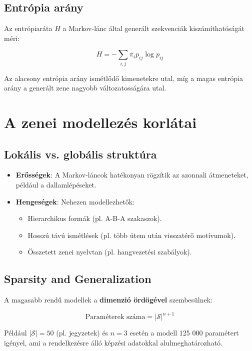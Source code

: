 \subsection{Entrópia arány}

Az entrópiaráta \( H \) a Markov-lánc által generált szekvenciák kiszámíthatóságát méri:

\[
H = -\sum_{i,j} \pi_i p_{ij} \log p_{ij}
\]

Az alacsony entrópia arány ismétlődő kimenetekre utal, míg a magas entrópia arány a generált zene nagyobb változatosságára utal.

\section{A zenei modellezés korlátai}

\subsection{Lokális vs. globális struktúra}

\begin{itemize}
    \item \textbf{Erősségek}: A Markov-láncok hatékonyan rögzítik az azonnali átmeneteket, például a dallamlépéseket.
    \item \textbf{Hengeségek}: Nehezen modellezhetők:
    \begin{itemize}
        \item Hierarchikus formák (pl. A-B-A szakaszok).
        \item Hosszú távú ismétlések (pl. több ütem után visszatérő motívumok).
        \item Összetett zenei nyelvtan (pl. hangvezetési szabályok).
    \end{itemize}
\end{itemize}

\subsection{Sparsity and Generalization}

A magasabb rendű modellek a \textbf{dimenzió ördögével} szembesülnek:

\[
\text{Paraméterek száma} = |\mathcal{S}|^{n+1}
\]

Például \( |\mathcal{S}| = 50 \) (pl. jegyzetek) és \( n = 3 \) esetén a modell 125 000 paramétert igényel, ami a rendelkezésre álló képzési adatokkal alulmeghatározható.


